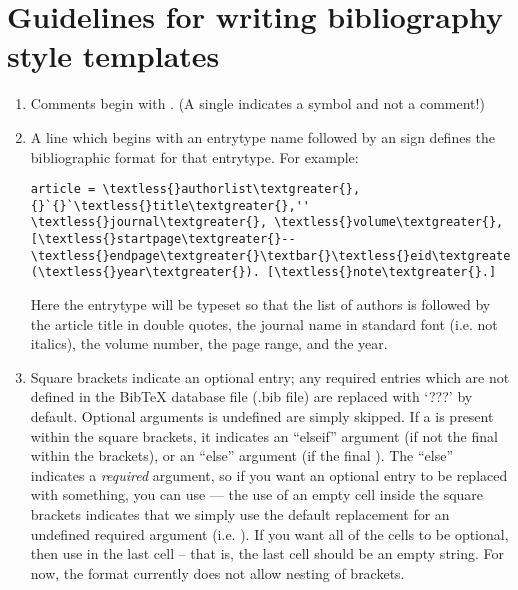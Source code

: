 \documentclass[letterpaper,10pt,english]{sphinxmanual}
\begin{document}
\chapter{Guidelines for writing bibliography style templates}
\label{guidelines_for_writing_style_templates:guidelines-for-writing-bibliography-style-templates}\label{guidelines_for_writing_style_templates::doc}\begin{enumerate}
\item {} 
Comments begin with \code{\#}. (A single \code{\#} indicates a symbol and not a comment!)

\item {} 
A line which begins with an entrytype name followed by an \code{=} sign defines the bibliographic format for that entrytype. For example:

\begin{Verbatim}[commandchars=\\\{\}]
article = \textless{}authorlist\textgreater{}, {}`{}`\textless{}title\textgreater{},'' \textless{}journal\textgreater{}, \textless{}volume\textgreater{}, [\textless{}startpage\textgreater{}--\textless{}endpage\textgreater{}\textbar{}\textless{}eid\textgreater{}\textbar{}]  (\textless{}year\textgreater{}). [\textless{}note\textgreater{}.]
\end{Verbatim}

Here the  entrytype will be typeset so that the list of authors is followed by the article title in double quotes, the journal name in standard font (i.e. not italics), the volume number, the page range, and the year.

\item {} 
Square brackets \code{{[}{]}} indicate an optional entry; any required entries which are not defined in the BibTeX database file (.bib file) are replaced with `???' by default. Optional arguments is undefined are simply skipped. If a \code{\textbar{}} is present within the square brackets, it indicates an ``elseif'' argument (if not the final \code{\textbar{}} within the brackets), or an ``else'' argument (if the final \code{\textbar{}}). The ``else'' indicates a \emph{required} argument, so if you want an optional entry to be replaced with something, you can use  --- the use of an empty cell inside the square brackets indicates that we simply use the default replacement for an undefined required argument (i.e. ). If you want all of the cells to be optional, then use \code{\textbar{}''{]}} in the last cell -- that is, the last cell should be an empty string. For  now, the format currently does not allow nesting of brackets.


\end{enumerate}
\end{document}
